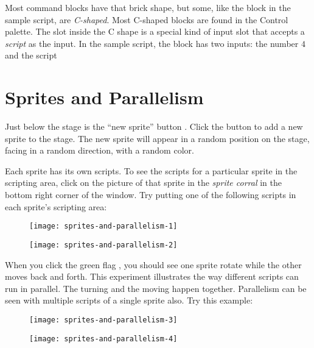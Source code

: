 \documentclass{report}
\begin{document}
Most command blocks have that brick shape, but some, like the  block in the sample script, are \emph{C-shaped}. Most C-shaped blocks are found in the Control palette. The slot inside the C shape is a special kind of input slot that accepts a \emph{script} as the input. In the sample script, the  block has two inputs: the number $4$ and the script


\section{Sprites and Parallelism}

Just below the stage is the ``new sprite'' button . Click the button to add a new sprite to the stage. The new sprite will appear in a random position on the stage, facing in a random direction, with a random color.

Each sprite has its own scripts. To see the scripts for a particular sprite in the scripting area, click on the picture of that sprite in the \emph{sprite corral} in the bottom right corner of the window. Try putting one of the following scripts in each sprite's scripting area:

\begin{figure}[H]
\begin{minipage}{0.5\textwidth}
\centering
\texttt{[image: sprites-and-parallelism-1]}
\end{minipage}%
\begin{minipage}{0.5\textwidth}
\centering
\texttt{[image: sprites-and-parallelism-2]}
\end{minipage}
\end{figure}

When you click the green flag , you should see one sprite rotate while the other moves back and forth. This experiment illustrates the way different scripts can run in parallel. The turning and the moving happen together. Parallelism can be seen with multiple scripts of a single sprite also. Try this example:

\begin{figure}[H]
\begin{minipage}{0.5\textwidth}
\centering
\texttt{[image: sprites-and-parallelism-3]}
\end{minipage}%
\begin{minipage}{0.5\textwidth}
\centering
\texttt{[image: sprites-and-parallelism-4]}
\end{minipage}
\end{figure}
\end{document}
